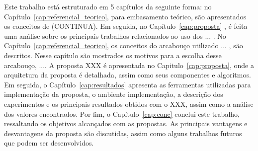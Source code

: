 Este trabalho está estruturado em 5 capítulos da seguinte forma: no Capítulo~\ref{cap:referencial_teorico}, para embasamento teórico, são apresentados os conceitos de (CONTINUA). Em seguida, no Capítulo~\ref{cap:proposta} , é feita uma análise sobre os principais trabalhos relacionados ao uso dos ... . No Capítulo~\ref{cap:referencial_teorico}, os conceitos do arcabouço utilizado ... , são descritos. Nesse capítulo são mostrados os motivos para a escolha desse arcabouço, .... A proposta XXX é apresentada no Capitulo~\ref{cap:proposta}, onde a arquitetura da proposta é detalhada, assim como seus componentes e algoritmos. Em seguida, o Capítulo~\ref{cap:resultados} apresenta as ferramentas utilizadas para implementação da proposta, o ambiente implementação, a descrição dos experimentos e os principais resultados obtidos com o XXX, assim como a análise dos valores encontrados. Por fim, o Capítulo~\ref{cap:conc} conclui este trabalho, ressaltando os objetivos alcançados com as propostas. As principais vantagens e desvantagens da proposta são discutidas, assim como alguns trabalhos futuros que podem ser desenvolvidos. 
